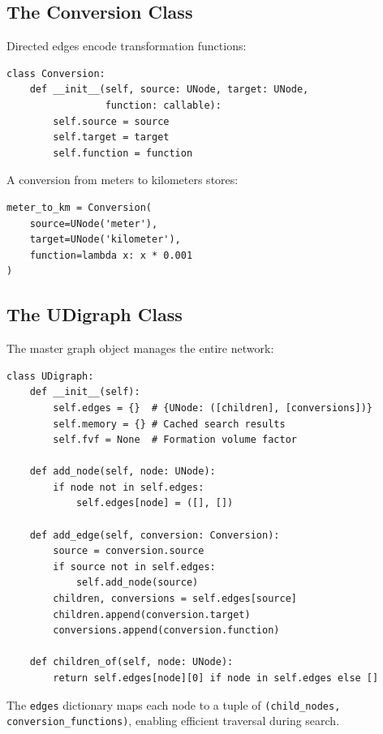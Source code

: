 \documentclass[11pt,a4paper]{report}
\begin{document}
\subsection{The Conversion Class}

Directed edges encode transformation functions:

\begin{lstlisting}[style=pythonstyle, caption={Conversion class structure}]
class Conversion:
    def __init__(self, source: UNode, target: UNode, 
                 function: callable):
        self.source = source
        self.target = target
        self.function = function
\end{lstlisting}

A conversion from meters to kilometers stores:
\begin{lstlisting}[style=pythonstyle]
meter_to_km = Conversion(
    source=UNode('meter'),
    target=UNode('kilometer'),
    function=lambda x: x * 0.001
)
\end{lstlisting}

\subsection{The UDigraph Class}

The master graph object manages the entire network:

\begin{lstlisting}[style=pythonstyle, caption={UDigraph core attributes}]
class UDigraph:
    def __init__(self):
        self.edges = {}  # {UNode: ([children], [conversions])}
        self.memory = {} # Cached search results
        self.fvf = None  # Formation volume factor
    
    def add_node(self, node: UNode):
        if node not in self.edges:
            self.edges[node] = ([], [])
    
    def add_edge(self, conversion: Conversion):
        source = conversion.source
        if source not in self.edges:
            self.add_node(source)
        children, conversions = self.edges[source]
        children.append(conversion.target)
        conversions.append(conversion.function)
    
    def children_of(self, node: UNode):
        return self.edges[node][0] if node in self.edges else []
\end{lstlisting}

The \texttt{edges} dictionary maps each node to a tuple of \texttt{(child\_nodes, conversion\_functions)}, enabling efficient traversal during search.
\end{document}
